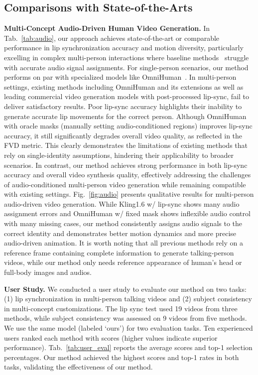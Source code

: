 \documentclass{article} %
\begin{document}
\subsection{Comparisons with State-of-the-Arts}
\noindent \textbf{Multi-Concept Audio-Driven Human Video Generation.}
In Tab.~\ref{tab:audio}, our approach achieves state-of-the-art or comparable performance in lip synchronization accuracy and motion diversity, particularly excelling in complex multi-person interactions where baseline methods~\citep{lin2024cyberhost,kuaishou2024} struggle with accurate audio signal assignments. For single-person scenarios, our method performs on par with specialized models like OmniHuman~\citep{lin2025omnihuman}. In multi-person settings, existing methods including OmniHuman and its extensions as well as leading commercial video generation models with post-processed lip-sync, fail to deliver satisfactory results. Poor lip-sync accuracy highlights their inability to generate accurate lip movements for the correct person. Although OmniHuman with oracle masks (manually setting audio-conditioned regions) improves lip-sync accuracy, it still significantly degrades overall video quality, as reflected in the FVD metric. This clearly demonstrates the limitations of existing methods that rely on single-identity assumptions, hindering their applicability to broader scenarios.
In contrast, our method achieves strong performance in both lip-sync accuracy and overall video synthesis quality, effectively addressing the challenges of audio-conditioned multi-person video generation while remaining compatible with existing settings.
Fig.~\ref{fig:audio} presents qualitative results for multi-person audio-driven video generation. While Kling1.6 w/ lip-sync shows many audio assignment errors and OmniHuman w/ fixed mask shows inflexible audio control with many missing cases, our method consistently assigns audio signals to the correct identity and demonstrates better motion dynamics and more precise audio-driven animation. It is worth noting that all previous methods rely on a reference frame containing complete information to generate talking-person videos, while our method only needs reference appearance of human's head or full-body images and audios.


\noindent \textbf{User Study.} We conducted a user study to evaluate our method on two tasks: (1) lip synchronization in multi-person talking videos and (2) subject consistency in multi-concept customizations. The lip sync test used 19 videos from three methods, while subject consistency was assessed on 9 videos from five methods. We use the same model (labeled `ours') for two evaluation tasks. Ten experienced users ranked each method with scores (higher values indicate superior performance). Tab.~\ref{tab:user_eval} reports the average scores and top-1 selection percentages. Our method achieved the highest scores and top-1 rates in both tasks, validating the effectiveness of our method.
\end{document}
